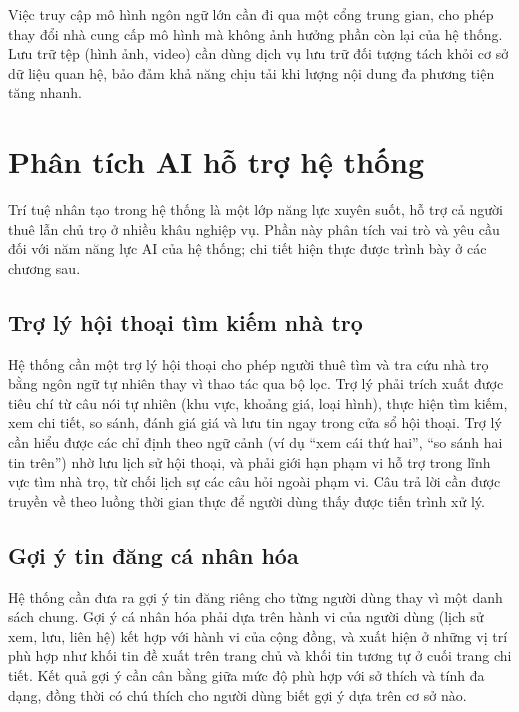 Việc truy cập mô hình ngôn ngữ lớn cần đi qua một cổng trung gian, cho phép thay đổi nhà cung cấp mô hình mà không ảnh hưởng phần còn lại của hệ thống. Lưu trữ tệp (hình ảnh, video) cần dùng dịch vụ lưu trữ đối tượng tách khỏi cơ sở dữ liệu quan hệ, bảo đảm khả năng chịu tải khi lượng nội dung đa phương tiện tăng nhanh.

\section{Phân tích AI hỗ trợ hệ thống}

Trí tuệ nhân tạo trong hệ thống là một lớp năng lực xuyên suốt, hỗ trợ cả người thuê lẫn chủ trọ ở nhiều khâu nghiệp vụ. Phần này phân tích vai trò và yêu cầu đối với năm năng lực AI của hệ thống; chi tiết hiện thực được trình bày ở các chương sau.

\FloatBarrier
\subsection{Trợ lý hội thoại tìm kiếm nhà trọ}

Hệ thống cần một trợ lý hội thoại cho phép người thuê tìm và tra cứu nhà trọ bằng ngôn ngữ tự nhiên thay vì thao tác qua bộ lọc. Trợ lý phải trích xuất được tiêu chí từ câu nói tự nhiên (khu vực, khoảng giá, loại hình), thực hiện tìm kiếm, xem chi tiết, so sánh, đánh giá giá và lưu tin ngay trong cửa sổ hội thoại. Trợ lý cần hiểu được các chỉ định theo ngữ cảnh (ví dụ ``xem cái thứ hai'', ``so sánh hai tin trên'') nhờ lưu lịch sử hội thoại, và phải giới hạn phạm vi hỗ trợ trong lĩnh vực tìm nhà trọ, từ chối lịch sự các câu hỏi ngoài phạm vi. Câu trả lời cần được truyền về theo luồng thời gian thực để người dùng thấy được tiến trình xử lý.

\FloatBarrier
\subsection{Gợi ý tin đăng cá nhân hóa}

Hệ thống cần đưa ra gợi ý tin đăng riêng cho từng người dùng thay vì một danh sách chung. Gợi ý cá nhân hóa phải dựa trên hành vi của người dùng (lịch sử xem, lưu, liên hệ) kết hợp với hành vi của cộng đồng, và xuất hiện ở những vị trí phù hợp như khối tin đề xuất trên trang chủ và khối tin tương tự ở cuối trang chi tiết. Kết quả gợi ý cần cân bằng giữa mức độ phù hợp với sở thích và tính đa dạng, đồng thời có chú thích cho người dùng biết gợi ý dựa trên cơ sở nào.

